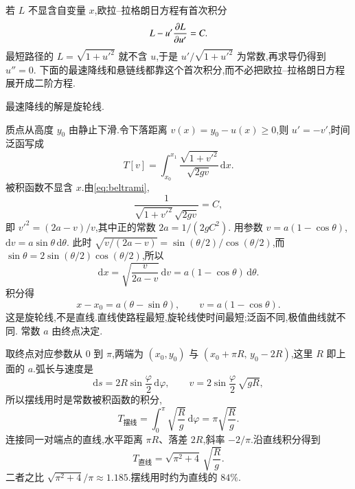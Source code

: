 若 $L$ 不显含自变量 $x$,欧拉--拉格朗日方程有首次积分
\begin{equation}
  L - u' \frac{\partial{L}}{\partial{u'}} = C .
  \label{eq:beltrami}
\end{equation}
最短路径的 $L=\sqrt{1+u'^2}$ 就不含 $u$,于是 $u'/\sqrt{1+u'^2}$ 为常数,再求导仍得到 $u''=0$.
下面的最速降线和悬链线都靠这个首次积分,而不必把欧拉--拉格朗日方程展开成二阶方程.

\begin{example}
最速降线的解是旋轮线.
\end{example}
\begin{solution}
质点从高度 $y_0$ 由静止下滑.令下落距离 $v(x)=y_0-u(x)\ge 0$,则 $u'=-v'$,时间泛函写成
\begin{equation}
  T[v] = \int_{x_0}^{x_1} \frac{\sqrt{1+v'^2}}{\sqrt{2gv}}\,\mathrm{d}x .
\end{equation}
被积函数不显含 $x$.由\eqref{eq:beltrami},
\begin{equation}
  \frac{1}{\sqrt{1+v'^2}\,\sqrt{2gv}} = C ,
\end{equation}
即 $v'^2 = (2a-v)/v$,其中正的常数 $2a=1/(2gC^2)$.
用参数 $v=a(1-\cos\theta)$,$\mathrm{d}v=a\sin\theta\,\mathrm{d}\theta$.
此时 $\sqrt{v/(2a-v)}=\sin(\theta/2)/\cos(\theta/2)$,而 $\sin\theta=2\sin(\theta/2)\cos(\theta/2)$,所以
\begin{equation}
  \mathrm{d}x = \sqrt{\frac{v}{2a-v}}\,\mathrm{d}v = a(1-\cos\theta)\,\mathrm{d}\theta .
\end{equation}
积分得
\begin{equation}
  x-x_0 = a(\theta-\sin\theta), \qquad v = a(1-\cos\theta).
\end{equation}
这是旋轮线,不是直线.直线使路程最短,旋轮线使时间最短;泛函不同,极值曲线就不同.
常数 $a$ 由终点决定.
\end{solution}

取终点对应参数从 $0$ 到 $\pi$,两端为 $(x_0,y_0)$ 与 $(x_0+\pi R,\, y_0-2R)$,这里 $R$ 即上面的 $a$.弧长与速度是
\begin{equation}
  \mathrm{d}s = 2R\sin\frac{\varphi}{2}\,\mathrm{d}\varphi,
  \qquad
  v = 2\sin\frac{\varphi}{2}\,\sqrt{gR},
\end{equation}
所以摆线用时是常数被积函数的积分,
\begin{equation}
  T_{\textrm{摆线}} = \int_0^{\pi}\sqrt{\frac{R}{g}}\,\mathrm{d}\varphi = \pi\sqrt{\frac{R}{g}}.
\end{equation}
连接同一对端点的直线,水平距离 $\pi R$、落差 $2R$,斜率 $-2/\pi$.沿直线积分得到
\begin{equation}
  T_{\textrm{直线}} = \sqrt{\pi^2+4}\,\sqrt{\frac{R}{g}}.
\end{equation}
二者之比 $\sqrt{\pi^2+4}/\pi\approx 1.185$.摆线用时约为直线的 $84\%$.

